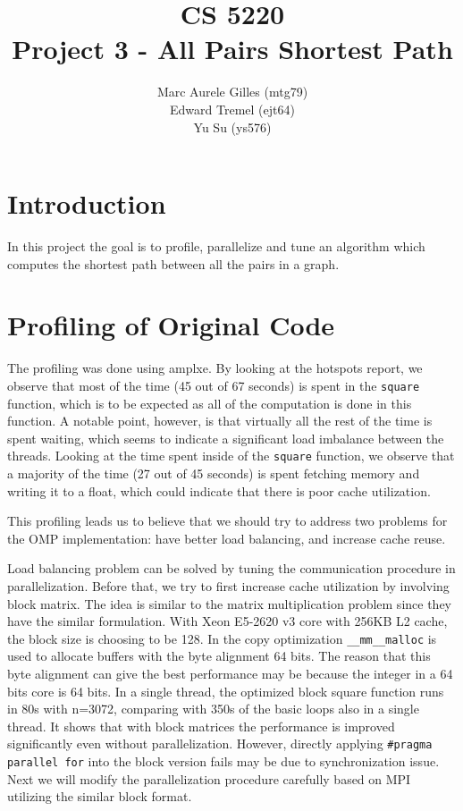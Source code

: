 \documentclass[11pt]{article}
\begin{document}
\title{CS 5220\\ Project 3 - All Pairs Shortest Path}
\author{Marc Aurele Gilles (mtg79)\\ Edward Tremel (ejt64) \\ Yu Su (ys576)}
\maketitle

\section{Introduction}
In this project the goal is to profile, parallelize and tune an algorithm which computes the shortest path between all the pairs in a graph.


\section{Profiling of Original Code}
The profiling was done using amplxe. By looking at the hotspots report, we observe that most of the time (45 out of 67 seconds) is spent in the \texttt{square} function, which is to be expected as all of the computation is done in this function. A notable point, however, is that virtually all the rest of the time is spent waiting, which seems to indicate a significant load imbalance between the threads.
Looking at the time spent inside of the \texttt{square} function, we observe that a majority of the time (27 out of 45 seconds) is spent fetching memory and writing it to a float, which could indicate that there is poor cache utilization.

This profiling leads us to believe that we should try to address two problems for the OMP implementation: have better load balancing, and increase cache reuse.

Load balancing problem can be solved by tuning the communication procedure in parallelization. Before that, we try to first increase cache utilization by involving block matrix. The idea is similar to the matrix multiplication problem since they have the similar formulation. With Xeon E5-2620 v3 core with 256KB L2 cache, the block size is choosing to be 128. In the copy optimization \texttt{\_\_mm\_\_malloc} is used to allocate buffers with the byte alignment 64 bits. The reason that this byte alignment can give the best performance may be because the integer in a 64 bits core is 64 bits. In a single thread, the optimized block square function runs in 80s with n=3072, comparing with 350s of the basic loops also in a single thread. It shows that with block matrices the performance is improved significantly even without parallelization. However, directly applying \texttt{\#pragma parallel for} into the block version fails may be due to synchronization issue. Next we will modify the parallelization procedure carefully based on MPI utilizing the similar block format.
\end{document}
